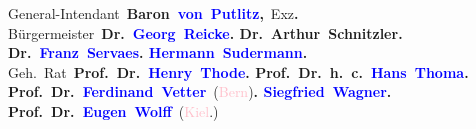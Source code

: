 {{                            General-Intendant \textbf{Baron \textcolor{blue}{von Putlitz}{}\ledrightnote{\textcolor{blue}{Joachim Gans zu Putlitz}},} Exz\textbf{.} Bürgermeister \textbf{Dr. \textcolor{blue}{Georg Reicke}{}\ledrightnote{\textcolor{blue}{Georg Reicke}}.
                            Dr. Arthur Schnitzler. Dr. \textcolor{blue}{Franz Servaes}{}\ledrightnote{\textcolor{blue}{Franz Servaes}}. \textcolor{blue}{Hermann Sudermann}{}\ledrightnote{\textcolor{blue}{Hermann Sudermann}}.} Geh. Rat \textbf{Prof. Dr. \textcolor{blue}{Henry Thode}{}\ledrightnote{\textcolor{blue}{Henry Thode}}. Prof. Dr. h. c. \textcolor{blue}{Hans Thoma}{}\ledrightnote{\textcolor{blue}{Hans Thoma}}. Prof. Dr. \textcolor{blue}{Ferdinand Vetter}{}\ledrightnote{\textcolor{blue}{Ferdinand Vetter}}} (\textcolor{pink}{Bern}{}\ledrightnote{\textcolor{pink}{Bern}})\textbf{. \textcolor{blue}{Siegfried Wagner}{}\ledrightnote{\textcolor{blue}{Siegfried Wagner}}. Prof. Dr. \textcolor{blue}{Eugen Wolff}{}\ledrightnote{\textcolor{blue}{Eugen Wolff}}} (\textcolor{pink}{Kiel}{}\ledrightnote{\textcolor{pink}{Kiel}}.)}}\pend
           \endnumbering{}  
      